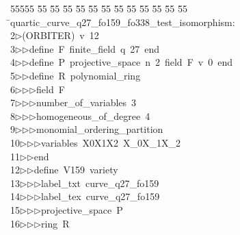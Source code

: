 %
%
\begin{tabbing}
55555 \= 55 \= 55 \= 55 \= 55 \= 55 \= 55 \= 55 \= 55 \= 55 \= 55 \= 55 \= 55 \= \>quartic\_curve\_q27\_fo159\_fo338\_test\_isomorphism:\\[0pt]
2\>$\triangleright$\>(ORBITER)\ v\ 12\ \\[0pt]
3\>$\triangleright$\>$\triangleright$\>define\ F\ finite\_field\ q\ 27\ end\ \\[0pt]
4\>$\triangleright$\>$\triangleright$\>define\ P\ projective\_space\ n\ 2\ field\ F\ v\ 0\ end\ \\[0pt]
5\>$\triangleright$\>$\triangleright$\>define\ R\ polynomial\_ring\ \\[0pt]
6\>$\triangleright$\>$\triangleright$\>$\triangleright$\>field\ F\ \\[0pt]
7\>$\triangleright$\>$\triangleright$\>$\triangleright$\>number\_of\_variables\ 3\ \\[0pt]
8\>$\triangleright$\>$\triangleright$\>$\triangleright$\>homogeneous\_of\_degree\ 4\ \\[0pt]
9\>$\triangleright$\>$\triangleright$\>$\triangleright$\>monomial\_ordering\_partition\ \\[0pt]
10\>$\triangleright$\>$\triangleright$\>$\triangleright$\>variables\ X0X1X2\ X\_0X\_1X\_2\ \\[0pt]
11\>$\triangleright$\>$\triangleright$\>end\ \\[0pt]
12\>$\triangleright$\>$\triangleright$\>define\ V159\ variety\ \\[0pt]
13\>$\triangleright$\>$\triangleright$\>$\triangleright$\>label\_txt\ curve\_q27\_fo159\ \\[0pt]
14\>$\triangleright$\>$\triangleright$\>$\triangleright$\>label\_tex\ curve\_q27\_fo159\ \\[0pt]
15\>$\triangleright$\>$\triangleright$\>$\triangleright$\>projective\_space\ P\ \\[0pt]
16\>$\triangleright$\>$\triangleright$\>$\triangleright$\>ring\ R\ \\[0pt]

\end{tabbing}
